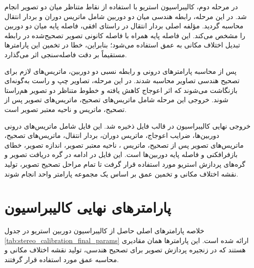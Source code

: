 در مرحله دوم، کالیبراسیون استریو با استفاده از نقاط متناظر میان دو تصویر انجام شد. در این مرحله، رابطه هندسی میان دو دوربین شامل ماتریس دوران و بردار انتقال محاسبه گردید. مؤلفه اصلی بردار انتقال در راستای افقی، فاصله پایه میان دو دوربین را مشخص می‌کند. این فاصله پایه همراه با فاصله کانونی تصویر تصحیح‌شده در رابطه تبدیل اختلاف مکانی به عمق استفاده می‌شود؛ بنابراین، خطا در تخمین این پارامترها مستقیماً بر دقت فاصله‌سنجی اثر می‌گذارد.

پس از محاسبه پارامترهای درونی و رابطه نسبی دو دوربین، ماتریس‌های لازم برای تصحیح هندسی تصاویر محاسبه شدند. در این مرحله، تصاویر چپ و راست به‌گونه‌ای بازنگاشت می‌شوند که اثر اعوجاج کاهش یافته و خطوط متناظر دو تصویر هم‌راستا شوند. خروجی این مرحله شامل ماتریس‌های تصحیح، ماتریس‌های تصویر پس از تصحیح، ماتریس  و ناحیه معتبر تصویر است.

خروجی نهایی کالیبراسیون در قالب فایل  ذخیره شد. این فایل شامل ماتریس‌های درونی دوربین‌ها، ضرایب اعوجاج، ماتریس دوران، بردار انتقال، ماتریس‌های تصحیح، ماتریس‌های تصویر پس از تصحیح، ماتریس ، ناحیه معتبر تصویر، اندازه تصویر، خطای بازفرافکنی و فاصله پایه دوربین‌ها است. این فایل در ادامه در گره دریافت تصویر و گره‌های پردازش استریو مورد استفاده قرار گرفت تا تمام مراحل تصحیح تصویر، تولید نقشه اختلاف مکانی و تخمین عمق بر اساس یک مجموعه پارامتر واحد انجام شوند.

\section{پارامترهای نهایی کالیبراسیون}
\label{app:stereo_calibration_final_params}

خلاصه پارامترهای اصلی حاصل از کالیبراسیون دوربین استریو در جدول \ref{tab:stereo_calibration_final_params} ارائه شده است. این پارامترها همان مقادیری هستند که در زنجیره پردازش تصویر برای تصحیح هندسی، تولید نقشه اختلاف مکانی و محاسبه عمق مورد استفاده قرار گرفتند.

